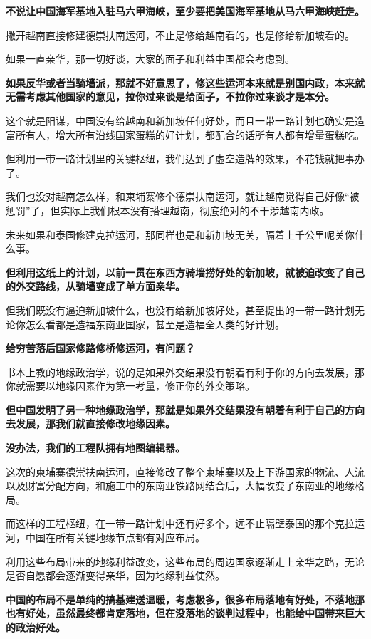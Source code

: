 \documentclass[UTF8, 11pt, oneside]{ctexart}
\newcommand{\zd}[1]{\textbf{\textcolor[RGB]{123,12,0}{#1}}} %
\begin{document}
\zd{不说让中国海军基地入驻马六甲海峡，至少要把美国海军基地从马六甲海峡赶走。}

撇开越南直接修建德崇扶南运河，不止是修给越南看的，也是修给新加坡看的。

如果一直亲华，那一切好谈，大家的面子和利益中国都会考虑到。

\zd{如果反华或者当骑墙派，那就不好意思了，修这些运河本来就是别国内政，本来就无需考虑其他国家的意见，拉你过来谈是给面子，不拉你过来谈才是本分。}

这个就是阳谋，中国没有给越南和新加坡任何好处，而且一带一路计划也确实是造富所有人，增大所有沿线国家蛋糕的好计划，都配合的话所有人都有增量蛋糕吃。

但利用一带一路计划里的关键枢纽，我们达到了虚空造牌的效果，不花钱就把事办了。

我们也没对越南怎么样，和柬埔寨修个德崇扶南运河，就让越南觉得自己好像“被惩罚”了，但实际上我们根本没有搭理越南，彻底绝对的不干涉越南内政。

未来如果和泰国修建克拉运河，那同样也是和新加坡无关，隔着上千公里呢关你什么事。

\zd{但利用这纸上的计划，以前一贯在东西方骑墙捞好处的新加坡，就被迫改变了自己的外交路线，从骑墙变成了单方面亲华。}

但我们既没有逼迫新加坡什么，也没有给新加坡好处，甚至提出的一带一路计划无论你怎么看都是造福东南亚国家，甚至是造福全人类的好计划。

\zd{给穷苦落后国家修路修桥修运河，有问题？}

书本上教的地缘政治学，说的是如果外交结果没有朝着有利于你的方向去发展，那你就需要以地缘因素作为第一考量，修正你的外交策略。

\zd{但中国发明了另一种地缘政治学，那就是如果外交结果没有朝着有利于自己的方向去发展，那我们就直接修改地缘因素。}

\zd{没办法，我们的工程队拥有地图编辑器。}

这次的柬埔寨德崇扶南运河，直接修改了整个柬埔寨以及上下游国家的物流、人流以及财富分配方向，和施工中的东南亚铁路网结合后，大幅改变了东南亚的地缘格局。

而这样的工程枢纽，在一带一路计划中还有好多个，远不止隔壁泰国的那个克拉运河，中国在所有关键地缘节点都有对应布局。

利用这些布局带来的地缘利益改变，这些布局的周边国家逐渐走上亲华之路，无论是否自愿都会逐渐变得亲华，因为地缘利益使然。

\zd{中国的布局不是单纯的搞基建送温暖，考虑极多，很多布局落地有好处，不落地那也有好处，虽然最终都肯定落地，但在没落地的谈判过程中，也能给中国带来巨大的政治好处。}
\end{document}
